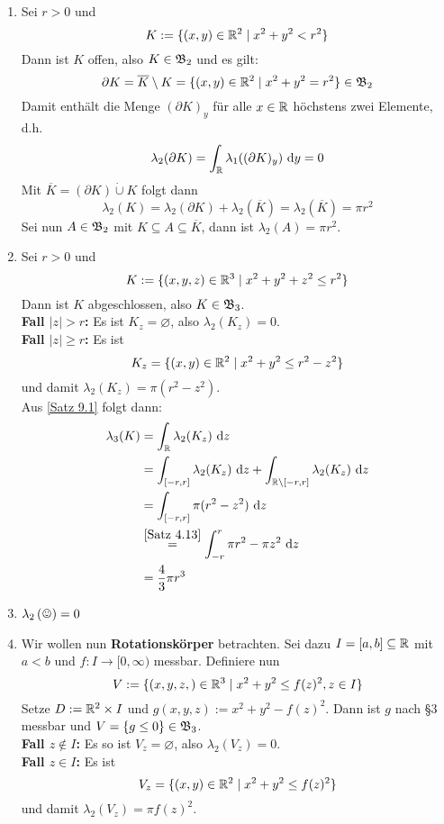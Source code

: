 \documentclass[a4paper,twoside,DIV15,BCOR12mm,chapterprefix=true,headings=onelinechapter]{scrbook}
\begin{document}
\begin{beispiel}
\begin{enumerate}
\item Sei $r>0$ und 
\[K:=\{(x,y)\in\mathbb{R}^2\mid x^2+y^2<r^2\}\]
Dann ist $K$ offen, also $K\in\mathfrak{B}_2$ und es gilt:
\[\partial K=\overline{K}\setminus K=\{(x,y)\in\mathbb{R}^2\mid x^2+y^2=r^2\}\in\mathfrak{B}_2\]
Damit enthält die Menge $(\partial K)_y$ für alle $x\in\mathbb{R}$ höchstens zwei Elemente, d.h.
\[\lambda_2(\partial K)=\int_{\mathbb{R}} \lambda_1((\partial K)_y)\text{ d}y=0\]
Mit $\overline K=(\partial K) \dot\cup K$ folgt dann
\[\lambda_2(K)=\lambda_2(\partial K)+\lambda_2(\overline K)=\lambda_2(\overline K)=\pi r^2\]
Sei nun $A\in\mathfrak{B}_2$ mit $K\subseteq A\subseteq\overline K$, dann ist $\lambda_2(A)=\pi r^2$.
\item Sei $r>0$ und 
\[K:=\{(x,y,z)\in\mathbb{R}^3\mid x^2+y^2+z^2\le r^2\}\]
Dann ist $K$ abgeschlossen, also $K\in\mathfrak{B}_3$.\\
\textbf{Fall $|z|>r$:} Es ist $K_z=\varnothing$, also $\lambda_2(K_z)=0$.\\
\textbf{Fall $|z|\ge r$:} Es ist
\[K_z=\{(x,y)\in\mathbb{R}^2\mid x^2+y^2\le r^2-z^2\}\]
und damit $\lambda_2(K_z)=\pi(r^2-z^2)$.\\
Aus \ref{Satz 9.1} folgt dann:
\begin{align*}
\lambda_3(K)&=\int_{\mathbb{R}} \lambda_2(K_z)\text{ d}z\\
&=\int_{[-r,r]}\lambda_2(K_z)\text{ d}z+\int_{\mathbb{R}\setminus[-r,r]}\lambda_2(K_z)\text{ d}z\\
&=\int_{[-r,r]}\pi(r^2-z^2)\text{ d}z\\
&\stackrel{\ref{Satz 4.13}}=\int_{-r}^r \pi r^2-\pi z^2\text{ d}z\\
&=\frac43\pi r^3
\end{align*}
\item $\lambda_2\left(\text{\smiley}\right)=0$
\item Wir wollen nun \textbf{Rotationskörper} betrachten. Sei dazu $I=[a,b]\subseteq\mathbb{R}$ mit $a<b$ und $f:I\to[0,\infty)$ messbar. Definiere nun
\[V:=\{(x,y,z,)\in\mathbb{R}^3\mid x^2+y^2\le f(z)^2, z\in I\}\]
Setze $D:=\mathbb{R}^2\times I$ und $g(x,y,z):= x^2+y^2-f(z)^2$. Dann ist $g$ nach §3 messbar und $V=\{g\le 0\}\in\mathfrak{B}_3$.\\
\textbf{Fall $z\not\in I$:} Es so ist $V_z=\varnothing$, also $\lambda_2(V_z)=0$.\\
\textbf{Fall $z\in I$:} Es ist
\[V_z=\{(x,y)\in\mathbb{R}^2\mid x^2+y^2\le f(z)^2\}\]
und damit $\lambda_2(V_z)=\pi f(z)^2$.\\

\end{enumerate}
\end{beispiel}
\end{document}

